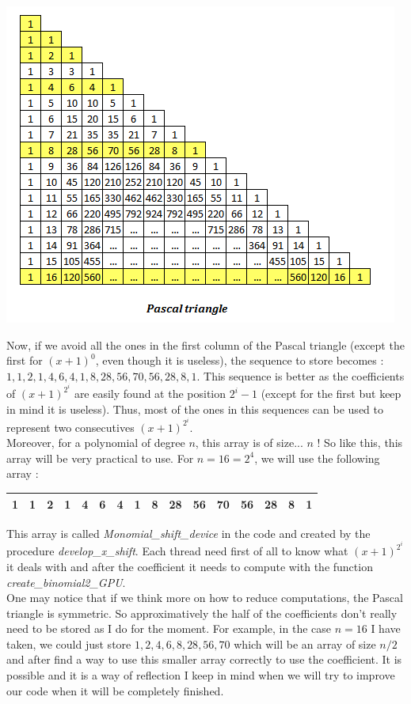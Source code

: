 \begin{center}
\includegraphics[scale=1]{PascalTriangle.png}
\end{center}

Now, if we avoid all the ones in the first column of the Pascal triangle (except the first for $(x+1)^0$, even though it is useless), the sequence to store becomes : $1,1,2,1,4,6,4,1,8,28,56,70,56,28,8,1$. This sequence is better as the coefficients of $(x+1)^{2^i}$ are easily found at the position $2^i-1$ (except for the first but keep in mind it is useless). Thus, most of the ones in this sequences can be used to represent two consecutives $(x+1)^{2^i}$.\\

Moreover, for a polynomial of degree $n$, this array is of size... $n$ ! So like this, this array will be very practical to use. For $n = 16 = 2^4$, we will use the following array :\\

\begin{center}
\begin{tabular}{|c||c||c|c||c|c|c|c||c|c|c|c|c|c|c|c||} \hline
1 & 1 & 2 & 1 & 4 & 6 & 4 & 1 & 8 & 28 & 56 & 70 & 56 & 28 & 8 & 1 \\ \hline
\end{tabular}
\end{center}

This array is called \textit{Monomial\_shift\_device} in the code and created by the procedure \textit{develop\_x\_shift}. Each thread need first of all to know what $(x+1)^{2^i}$ it deals with and after the coefficient it needs to compute with the function \textit{create\_binomial2\_GPU}.\\

One may notice that if we think more on how to reduce computations, the Pascal triangle is symmetric. So approximatively the half of the coefficients don't really need to be stored as I do for the moment. For example, in the case $n=16$ I have taken, we could just store $1,2,4,6,8,28,56,70$ which will be an array of size $n/2$ and after find a way to use this smaller array correctly to use the coefficient. It is possible and it is a way of reflection I keep in mind when we will try to improve our code when it will be completely finished.\\
